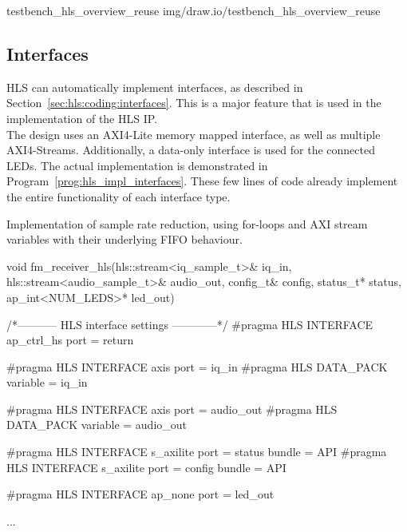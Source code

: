  {testbench_hls_overview_reuse} {img/draw.io/testbench_hls_overview_reuse}

\subsection{Interfaces}
\label{sec:impl:hls:interfaces}

HLS can automatically implement interfaces, as described in Section~\ref{sec:hls:coding:interfaces}.
This is a major feature that is used in the implementation of the HLS IP.\\

The design uses an AXI4-Lite memory mapped interface, as well as multiple AXI4-Streams.
Additionally, a data-only interface is used for the connected LEDs.
The actual implementation is demonstrated in Program~\ref{prog:hls_impl_interfaces}.
These few lines of code already implement the entire functionality of each interface type.\\


\begin{program}
  \caption{Implementation of sample rate reduction, using for-loops and AXI stream variables with their underlying FIFO behaviour.}
  \label{prog:hls_impl_interfaces}
\begin{CppCode}
void fm_receiver_hls(hls::stream<iq_sample_t>& iq_in,
                     hls::stream<audio_sample_t>& audio_out,
                     config_t& config,
                     status_t* status,
                     ap_int<NUM_LEDS>* led_out) {

  /*----------- HLS interface settings ------------*/
  #pragma HLS INTERFACE ap_ctrl_hs port = return

  #pragma HLS INTERFACE axis port = iq_in
  #pragma HLS DATA_PACK variable  = iq_in

  #pragma HLS INTERFACE axis port = audio_out
  #pragma HLS DATA_PACK variable  = audio_out

  #pragma HLS INTERFACE s_axilite port = status bundle = API
  #pragma HLS INTERFACE s_axilite port = config bundle = API

  #pragma HLS INTERFACE ap_none port = led_out

  ...
}
\end{CppCode}
\end{program}

